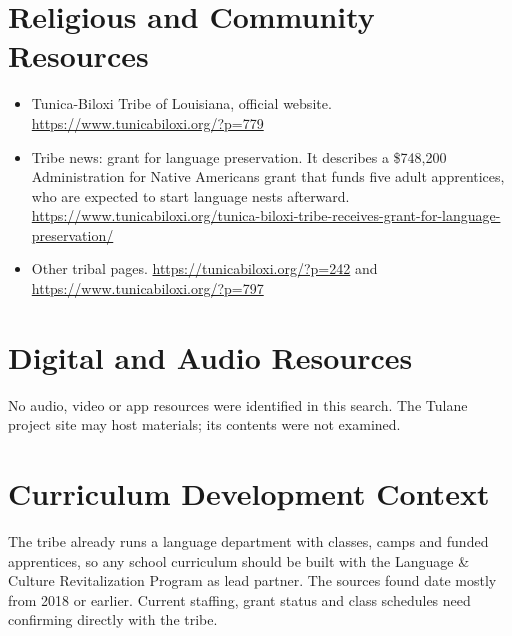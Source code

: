 \documentclass[12pt]{article}
\begin{document}
\section{Religious and Community Resources}
\begin{itemize}
\item Tunica-Biloxi Tribe of Louisiana, official website. \url{https://www.tunicabiloxi.org/?p=779}
\item Tribe news: grant for language preservation. It describes a \$748,200 Administration for Native Americans grant that funds five adult apprentices, who are expected to start language nests afterward. \url{https://www.tunicabiloxi.org/tunica-biloxi-tribe-receives-grant-for-language-preservation/}
\item Other tribal pages. \url{https://tunicabiloxi.org/?p=242} and \url{https://www.tunicabiloxi.org/?p=797}
\end{itemize}

\section{Digital and Audio Resources}
No audio, video or app resources were identified in this search. The Tulane project site may host materials; its contents were not examined.

\section{Curriculum Development Context}
The tribe already runs a language department with classes, camps and funded apprentices, so any school curriculum should be built with the Language \& Culture Revitalization Program as lead partner. The sources found date mostly from 2018 or earlier. Current staffing, grant status and class schedules need confirming directly with the tribe.
\end{document}
